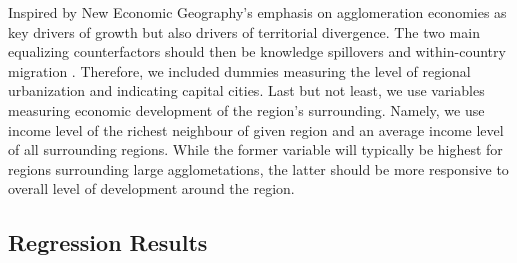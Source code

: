 \documentclass[11pt]{article}
\begin{document}
Inspired by New Economic Geography's emphasis on agglomeration economies as key drivers of growth but also drivers of territorial divergence. The two main equalizing 
counterfactors should then be knowledge spillovers and within-country migration  \citep{iammarino2017regional}. Therefore, we included dummies measuring the level of regional urbanization and indicating capital cities. %
Last but not least, we use variables measuring economic development of the region's surrounding. Namely, we use income level of the richest neighbour of given region and an average income level of all surrounding regions. While the former variable will typically be highest for regions surrounding large agglometations, the latter should be more responsive to overall level of development around the region.

\subsection{Regression Results}
\end{document}
